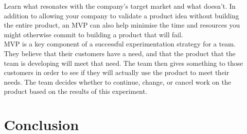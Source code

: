 \documentclass[paper=a4, fontsize=11pt]{scrartcl}
\numberwithin{equation}{section}		%
\numberwithin{figure}{section}			%
\numberwithin{table}{section}				%
\begin{document}
Learn what resonates with the company's target market and what doesn't. In addition to allowing your company to validate a product idea without building the entire product, an MVP can also help minimise the time and resources you might otherwise commit to building a product that will fail.\\
MVP is a key component of a successful experimentation strategy for a team. They believe that their customers have a need, and that the product that the team is developing will meet that need. The team then gives something to those customers in order to see if they will actually use the product to meet their needs. The team decides whether to continue, change, or cancel work on the product based on the results of this experiment.
\pagebreak
\section{Conclusion}

\newpage

\end{document}
